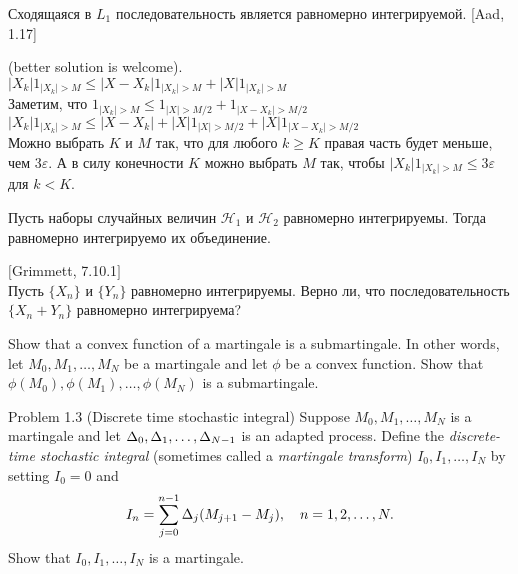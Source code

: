 \begin{problem}
Сходящаяся в $L_{1}$ последовательность является равномерно
интегрируемой. [Aad, 1.17] 
\end{problem} 
\begin{solution} 

(better solution is welcome). \\
$|X_{k}|1_{|X_{k}|>M}\le |X-X_{k}|1_{|X_{k}|>M}+|X|1_{|X_{k}|>M}$
\\
Заметим, что $1_{|X_{k}|>M}\le 1_{|X|>M/2}+1_{|X-X_{k}|>M/2}$ \\
$|X_{k}|1_{|X_{k}|>M}\le
|X-X_{k}|+|X|1_{|X|>M/2}+|X|1_{|X-X_{k}|>M/2}$ \\
Можно выбрать $K$ и $M$ так, что для любого $k\ge K$ правая часть
будет меньше, чем $3\varepsilon$. А в силу конечности $K$ можно
выбрать $M$ так, чтобы $|X_{k}|1_{|X_{k}|>M}\le 3\varepsilon$ для
$k<K$.
\end{solution}

\begin{problem}
Пусть наборы случайных величин $\mathcal{H}_{1}$ и
$\mathcal{H}_{2}$ равномерно интегрируемы.
Тогда равномерно интегрируемо их объединение. 
\end{problem} 
\begin{solution} 

\end{solution}

\begin{problem}
 $[$Grimmett, 7.10.1$]$\\
 Пусть $\{X_{n}\}$ и $\{Y_{n}\}$ равномерно
интегрируемы. Верно ли, что последовательность $\{X_{n}+Y_{n}\}$
равномерно интегрируема?
\end{problem} 
\begin{solution} 

\end{solution}

\begin{problem}
 Show that a convex function of a martingale is a submartingale.
In other words, let $M_0,M_1,\dots,M_N$ be a martingale and let $\phi$ be a convex function.
Show that $\phi(M_0),\phi(M_1),\dots,\phi(M_N)$ is a submartingale.
\end{problem} 
\begin{solution} 

\end{solution}

\begin{problem}
Problem 1.3 (Discrete time stochastic integral) Suppose $M_0,M_1,\dots,M_N$
is a martingale and let $\Delta_0,\Delta_1,\dots,\Delta_{N-1}$ is an adapted process. Define the
\emph{discrete-time stochastic integral} (sometimes called a \emph{martingale transform})
$I_0,I_1,\dots,I_N$ by setting $I_0=0$ and
\[
I_n=\sum\limits_{j=0}^{n-1} \Delta_j (M_{j+1}-M_j),\quad n=1,2,\dots,N.
\]
\ni Show that $I_0,I_1,\dots,I_N$ is a martingale.
\end{problem} 
\begin{solution} 

\end{solution}

